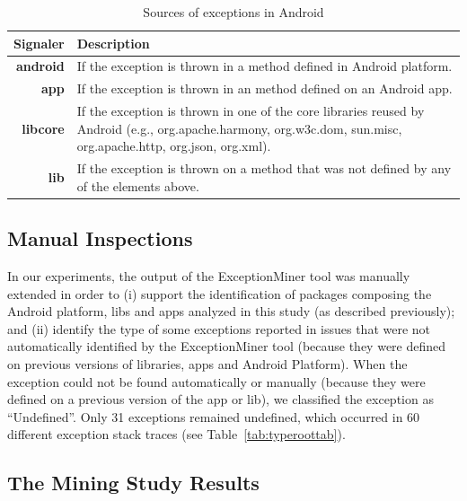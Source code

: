 
\begin{table}
  \centering
  \scriptsize
  \begin{tabular}{rp{29em}}
    \hline
    \bfseries{Signaler} & \bfseries{Description} \\
    \hline
    \bfseries{android} & If the exception is thrown in a method defined in Android platform.\\
    \bfseries{app}     & If the exception is thrown in an method defined on an Android app.\\
    \bfseries{libcore} & If the exception is thrown in one of the core libraries reused by Android (e.g., org.apache.harmony, org.w3c.dom, sun.misc, org.apache.http, org.json, org.xml). \\
    \bfseries{lib}     & If the exception is thrown on a method that was not defined by any of the elements above.\\
    \hline
  \end{tabular}
  \caption{Sources of exceptions in Android}
  \label{tab:signalers}
\end{table}

\subsection{Manual Inspections}
\label{sec:manual}
In our experiments, the output of the ExceptionMiner tool was manually extended
in order to 
(i) support the identification of packages composing the Android platform, 
libs and apps analyzed in this study (as described previously); and (ii)  
identify the type of some exceptions reported in issues 
that were not automatically identified by the ExceptionMiner tool
(because they were defined on previous versions of libraries,
apps and Android Platform). When the exception could not be  
found automatically or manually (because they were defined on a previous version
of the app or lib), we classified the exception as ``Undefined''.  Only 31 exceptions 
remained undefined, which occurred in 60 different exception stack traces (see Table~\ref{tab:typeroottab}).

\subsection{The Mining Study Results}
\label{sec:result}


